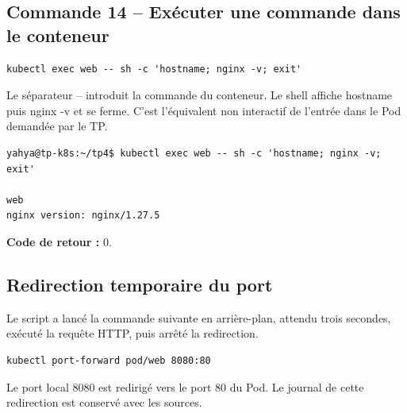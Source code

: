 \documentclass[11pt,a4paper]{article}
\begin{document}
\subsection{Commande 14 -- Exécuter une commande dans le conteneur}
\begin{lstlisting}
kubectl exec web -- sh -c 'hostname; nginx -v; exit'
\end{lstlisting}
Le séparateur -- introduit la commande du conteneur. Le shell affiche hostname puis nginx -v et se ferme. C’est l’équivalent non interactif de l’entrée dans le Pod demandée par le TP.
\begin{tcolorbox}[terminal,title={Ubuntu / WSL2 -- Commande 14 -- rendu reconstitué}]
\begin{Verbatim}[fontsize=\scriptsize,breaklines=true,breakanywhere=true,breaksymbolleft={},breaksymbolright={}]
yahya@tp-k8s:~/tp4$ kubectl exec web -- sh -c 'hostname; nginx -v; exit'

web
nginx version: nginx/1.27.5
\end{Verbatim}
\end{tcolorbox}
\textbf{Code de retour :} 0.

\subsection{Redirection temporaire du port}
Le script a lancé la commande suivante en arrière-plan, attendu trois secondes, exécuté la requête HTTP, puis arrêté la redirection.
\begin{lstlisting}
kubectl port-forward pod/web 8080:80
\end{lstlisting}
Le port local 8080 est redirigé vers le port 80 du Pod. Le journal de cette redirection est conservé avec les sources.
\end{document}
